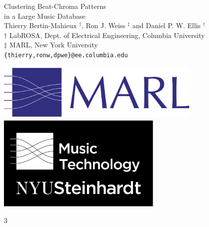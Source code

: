 \documentclass[portrait,a0b,final]{a0poster}
\newenvironment{poster}{
  \begin{center}
  \begin{minipage}[c]{0.98\textwidth}
}{
  \end{minipage} 
  \end{center}
}
\newenvironment{pcolumn}[1]{
  \begin{minipage}{#1\textwidth}
  \begin{center}
}{
  \end{center}
  \end{minipage}
}
\begin{document}
\begin{poster}
\begin{center}
\begin{pcolumn}{0.98}
{%
\begin{minipage}[c][9cm][c]{0.58\textwidth}
  \begin{center}
    {\sc \Huge Clustering Beat-Chroma Patterns}\\[5mm]
  {\sc \Huge in a Large Music Database}\\[10mm]
    {\Large Thierry Bertin-Mahieux $^\dagger$, Ron J. Weiss $^\ddagger$ and Daniel P. W. Ellis $^\dagger$\\[3.5mm]
     \large $\dagger$ LabROSA, Dept. of Electrical Engineering, Columbia University \\
     \large $\ddagger$ MARL, New York University \\
    \tt{\{thierry,ronw,dpwe\}@ee.columbia.edu}}
  \end{center}
\end{minipage}
\begin{minipage}[c][7cm][c]{0.2\textwidth}
  \begin{center}
    \includegraphics[width=10cm,angle=0]{MARL_logo_high_res.eps} \\
    \vspace{1.8cm}
    \includegraphics[width=8cm,angle=0]{nyu_music_tech_logo_2_2_bw.eps}
  \end{center}
\end{minipage}



}
\end{pcolumn}
\end{center}

\vspace*{0.5cm}


\begin{multicols}{3}



\end{multicols}
\end{poster}
\end{document}
